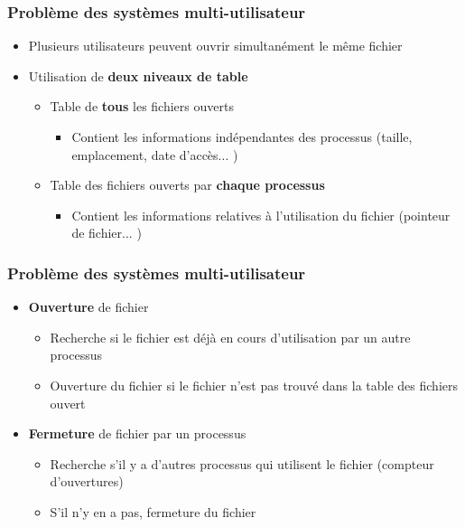 \begin{frame}
\frametitle{Problème des systèmes multi-utilisateur}
\begin{itemize}
\item Plusieurs utilisateurs peuvent ouvrir simultanément le même fichier
\item Utilisation de \textbf{deux niveaux de table}
\begin{itemize}
\item Table de \textbf{tous} les fichiers ouverts
\begin{itemize}
\item Contient les informations indépendantes des processus (taille, emplacement, date d'accès... )
\end{itemize}
\item Table des fichiers ouverts par \textbf{chaque processus}
\begin{itemize}
\item Contient les informations relatives à l'utilisation du fichier (pointeur de fichier... )
\end{itemize}
\end{itemize}
\end{itemize}
\end{frame}

\begin{frame}
\frametitle{Problème des systèmes multi-utilisateur}
\begin{itemize}
\item \textbf{Ouverture} de fichier
\begin{itemize}
\item Recherche si le fichier est déjà en cours d'utilisation par un autre processus
\item Ouverture du fichier si le fichier n'est pas trouvé dans la table des fichiers ouvert
\end{itemize}
\item \textbf{Fermeture} de fichier par un processus
\begin{itemize}
\item Recherche s'il y a d'autres processus qui utilisent le fichier (compteur d'ouvertures)
\item S'il n'y en a pas, fermeture du fichier
\end{itemize}
\end{itemize}
\end{frame}

